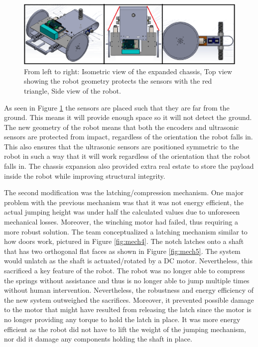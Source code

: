 \documentclass[ece]{uw-wkrpt}
\begin{document}
\begin{figure}[!htb]
    \centering
      \captionsetup{justification=centering}
    \includegraphics[width=5.5in]{res/mech3}
    \caption[Different views of final design]
          {From left to right: Isometric view of the expanded chassis, Top view showing the robot geometry protects the sensors with the red triangle, Side view of the robot.}
    \label{fig:mech3}
\end{figure}

As seen in Figure \ref{fig:mech3} the sensors are placed such that they are far from the ground. This means it will provide enough space so it will not detect the ground. The new geometry of the robot means that both the encoders and ultrasonic sensors are protected from impact, regardless of the orientation the robot falls in. This also ensures that the ultrasonic sensors are positioned symmetric to the robot in such a way that it will work regardless of the orientation that the robot falls in. The chassis expansion also provided extra real estate to store the payload inside the robot while improving structural integrity.

The second modification was the latching/compression mechanism. One major problem with the previous mechanism was that it was not energy efficient, the actual jumping height was under half the calculated values due to unforeseen mechanical losses. Moreover, the winching motor had failed, thus requiring a more robust solution. The team conceptualized a latching mechanism similar to how doors work, pictured in Figure \ref{fig:mech4}. The notch latches onto a shaft that has two orthogonal flat faces as shown in Figure \ref{fig:mech5}. The system would unlatch as the shaft is actuated/rotated by a DC motor. Nevertheless, this sacrificed a key feature of the robot. The robot was no longer able to compress the springs without assistance and thus is no longer able to jump multiple times without human intervention. Nevertheless, the robustness and energy efficiency of the new system outweighed the sacrifices. Moreover, it prevented possible damage to the motor that might have resulted from releasing the latch since the motor is no longer providing any torque to hold the latch in place. It was more energy efficient as the robot did not have to lift the weight of the jumping mechanism, nor did it damage any components holding the shaft in place. 
\end{document}
